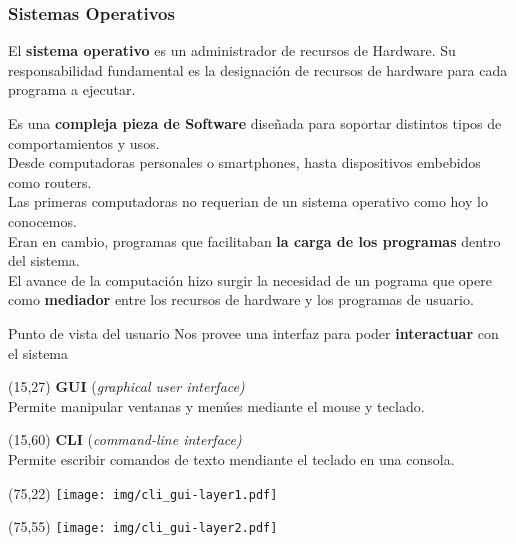 \documentclass[aspectratio=169]{beamer}
\begin{document}
\begin{frame}
    \frametitle{Sistemas Operativos}
    \vspace{0.7cm}
    \begin{tcolorbox}[width=\textwidth,colback={verdeuca!30},title={}]
    El \textbf{sistema operativo} es un administrador de recursos de Hardware.
    Su responsabilidad fundamental es la designación de recursos de hardware para cada programa a ejecutar.
    \end{tcolorbox}
    \small
    \bigskip
    \pause
    Es una \textcolor{verdeuca}{\textbf{compleja pieza de Software}} diseñada para soportar distintos tipos de comportamientos y usos.\\
    Desde computadoras personales o smartphones, hasta dispositivos embebidos como routers.\\
    \bigskip
    \pause
    Las primeras computadoras no requerian de un sistema operativo como hoy lo conocemos.\\
    Eran en cambio, programas que facilitaban \textcolor{verdeuca}{\textbf{la carga de los programas}} dentro del sistema.\\
    \bigskip
    El avance de la computación hizo surgir la necesidad de un pograma que opere como \textcolor{verdeuca}{\textbf{mediador}} entre los recursos de hardware y los programas de usuario.
\end{frame}

\begin{frame}[t]{Punto de vista del usuario}
    Nos provee una interfaz para poder \textcolor{verdeuca}{\textbf{interactuar}} con el sistema
    \begin{textblock}{50}(15,27)
    \normalsize \textbf{GUI} (\emph{graphical user interface)}\\
    \small Permite manipular ventanas y menúes mediante el mouse y teclado.
    \end{textblock}
    \begin{textblock}{50}(15,60)
    \normalsize \textbf{CLI} (\emph{command-line interface)}\\
    \small Permite escribir comandos de texto mendiante el teclado en una consola.
    \end{textblock}
    \begin{textblock}{50}(75,22)
    \texttt{[image: img/cli\_gui-layer1.pdf]}
    \end{textblock}
    \begin{textblock}{50}(75,55)
    \texttt{[image: img/cli\_gui-layer2.pdf]}
    \end{textblock}
\end{frame}
\end{document}
